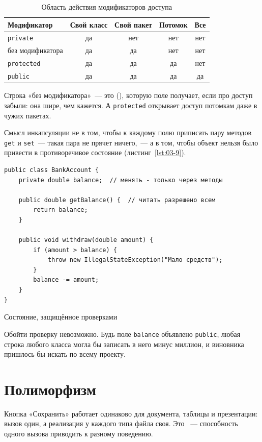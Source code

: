 \begin{table}[htbp]
\caption{Область действия модификаторов доступа}
\label{tab:03-1}
\centering
\begin{tabular}{L{4.2cm}cccc}
\toprule
Модификатор & Свой класс & Свой пакет & Потомок & Все \\
\midrule
\texttt{private} & да & нет & нет & нет \\
без модификатора & да & да & нет & нет \\
\texttt{protected} & да & да & да & нет \\
\texttt{public} & да & да & да & да \\
\bottomrule
\end{tabular}
\end{table}

Строка «без модификатора»~--- это 
(), которую поле получает, если про доступ забыли: она
шире, чем кажется. А \texttt{protected} открывает доступ потомкам даже в чужих
пакетах.

Смысл инкапсуляции не в том, чтобы к каждому полю приписать пару методов
\texttt{get} и \texttt{set}~--- такая пара не прячет ничего,~--- а в том, чтобы
объект нельзя было привести в противоречивое состояние
(листинг~\ref{lst:03-9}).

\begin{listing}[H]
\begin{verbatim}
public class BankAccount {
    private double balance;  // менять - только через методы

    public double getBalance() {  // читать разрешено всем
        return balance;
    }

    public void withdraw(double amount) {
        if (amount > balance) {
            throw new IllegalStateException("Мало средств");
        }
        balance -= amount;
    }
}
\end{verbatim}
\caption{Состояние, защищённое проверками}
\label{lst:03-9}
\end{listing}

Обойти проверку невозможно. Будь поле \texttt{balance} объявлено
\texttt{public}, любая строка любого класса могла бы записать в него минус
миллион, и виновника пришлось бы искать по всему проекту.

\section{Полиморфизм}

Кнопка «Сохранить» работает одинаково для документа, таблицы и презентации:
вызов один, а реализация у каждого типа файла своя. Это ~---
способность одного вызова приводить к разному поведению.

